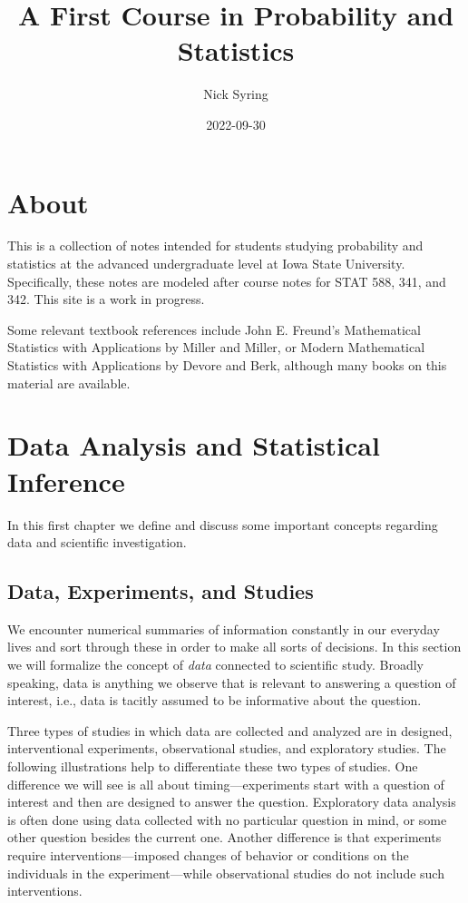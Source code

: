 \documentclass[
]{book}
\title{A First Course in Probability and Statistics}
\author{Nick Syring}
\date{2022-09-30}
\begin{document}
\maketitle

{
\setcounter{tocdepth}{1}
\tableofcontents
}
\hypertarget{about}{%
\chapter{About}\label{about}}

This is a collection of notes intended for students studying probability and statistics at the advanced undergraduate level at Iowa State University. Specifically, these notes are modeled after course notes for STAT 588, 341, and 342. This site is a work in progress.

Some relevant textbook references include John E. Freund's Mathematical Statistics with Applications by Miller and Miller, or Modern Mathematical Statistics with Applications by Devore and Berk, although many books on this material are available.

\hypertarget{data-analysis-and-statistical-inference}{%
\chapter{Data Analysis and Statistical Inference}\label{data-analysis-and-statistical-inference}}

In this first chapter we define and discuss some important concepts regarding data and scientific investigation.

\hypertarget{data-experiments-and-studies}{%
\section{Data, Experiments, and Studies}\label{data-experiments-and-studies}}

We encounter numerical summaries of information constantly in our everyday lives and sort through these in order to make all sorts of decisions. In this section we will formalize the concept of \emph{data} connected to scientific study. Broadly speaking, data is anything we observe that is relevant to answering a question of interest, i.e., data is tacitly assumed to be informative about the question.

Three types of studies in which data are collected and analyzed are in designed, interventional experiments, observational studies, and exploratory studies. The following illustrations help to differentiate these two types of studies. One difference we will see is all about timing---experiments start with a question of interest and then are designed to answer the question. Exploratory data analysis is often done using data collected with no particular question in mind, or some other question besides the current one. Another difference is that experiments require interventions---imposed changes of behavior or conditions on the individuals in the experiment---while observational studies do not include such interventions.
\end{document}
